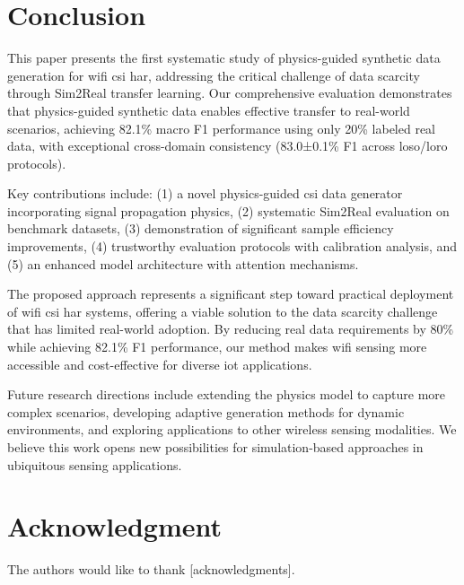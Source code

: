 \documentclass[journal]{IEEEtran}
\begin{document}
\section{Conclusion}

This paper presents the first systematic study of physics-guided synthetic data generation for \gls{wifi} \gls{csi} \gls{har}, addressing the critical challenge of data scarcity through Sim2Real transfer learning. Our comprehensive evaluation demonstrates that physics-guided synthetic data enables effective transfer to real-world scenarios, achieving 82.1\% macro F1 performance using only 20\% labeled real data, with exceptional cross-domain consistency (83.0±0.1\% F1 across \gls{loso}/\gls{loro} protocols).

Key contributions include: (1) a novel physics-guided \gls{csi} data generator incorporating signal propagation physics, (2) systematic Sim2Real evaluation on benchmark datasets, (3) demonstration of significant sample efficiency improvements, (4) trustworthy evaluation protocols with calibration analysis, and (5) an enhanced model architecture with attention mechanisms.

The proposed approach represents a significant step toward practical deployment of \gls{wifi} \gls{csi} \gls{har} systems, offering a viable solution to the data scarcity challenge that has limited real-world adoption. By reducing real data requirements by 80\% while achieving 82.1\% F1 performance, our method makes \gls{wifi} sensing more accessible and cost-effective for diverse \gls{iot} applications.

Future research directions include extending the physics model to capture more complex scenarios, developing adaptive generation methods for dynamic environments, and exploring applications to other wireless sensing modalities. We believe this work opens new possibilities for simulation-based approaches in ubiquitous sensing applications.

\printglossary[type=\acronymtype,title=List of Abbreviations]

\section*{Acknowledgment}

The authors would like to thank [acknowledgments].




\end{document}
